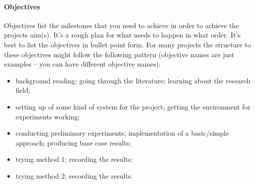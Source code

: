\documentclass[12pt]{article}
\begin{document}
\paragraph{Objectives}
Objectives list the milestones that you need to achieve in order to achieve the projects aim(s). It's a rough plan for what needs to happen in what order. It's best to list the objectives in bullet point form. For many projects the structure to these objectives might follow the following pattern (objective names are just examples -- you can have different objective names):    
\begin{itemize}[noitemsep]
\item background reading; going through the literature; learning about the research field;
\item setting up of some kind of system for the project; getting the environment for experiments working;
\item conducting preliminary experiments; implementation of a basic/simple approach; producing base case results;
\item trying method 1; recording the results;
\item trying method 2; recording the results.
\end{itemize}
\end{document}
